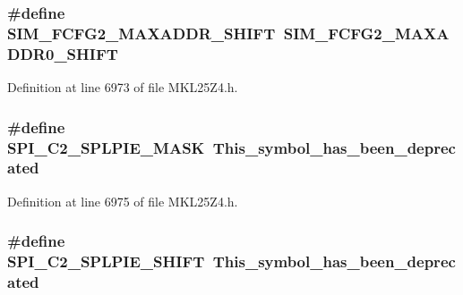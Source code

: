 \subsubsection[{\texorpdfstring{S\+I\+M\+\_\+\+F\+C\+F\+G2\+\_\+\+M\+A\+X\+A\+D\+D\+R\+\_\+\+S\+H\+I\+FT}{SIM_FCFG2_MAXADDR_SHIFT}}]{\setlength{\rightskip}{0pt plus 5cm}\#define S\+I\+M\+\_\+\+F\+C\+F\+G2\+\_\+\+M\+A\+X\+A\+D\+D\+R\+\_\+\+S\+H\+I\+FT~{\bf S\+I\+M\+\_\+\+F\+C\+F\+G2\+\_\+\+M\+A\+X\+A\+D\+D\+R0\+\_\+\+S\+H\+I\+FT}}\hypertarget{group___backward___compatibility___symbols_gae8fbe7e05f4c39ee13322ab15d75d089}{}\label{group___backward___compatibility___symbols_gae8fbe7e05f4c39ee13322ab15d75d089}


Definition at line 6973 of file M\+K\+L25\+Z4.\+h.

\subsubsection[{\texorpdfstring{S\+P\+I\+\_\+\+C2\+\_\+\+S\+P\+L\+P\+I\+E\+\_\+\+M\+A\+SK}{SPI_C2_SPLPIE_MASK}}]{\setlength{\rightskip}{0pt plus 5cm}\#define S\+P\+I\+\_\+\+C2\+\_\+\+S\+P\+L\+P\+I\+E\+\_\+\+M\+A\+SK~This\+\_\+symbol\+\_\+has\+\_\+been\+\_\+deprecated}\hypertarget{group___backward___compatibility___symbols_gadcaa58bac25c102454d3f54da041122f}{}\label{group___backward___compatibility___symbols_gadcaa58bac25c102454d3f54da041122f}


Definition at line 6975 of file M\+K\+L25\+Z4.\+h.

\subsubsection[{\texorpdfstring{S\+P\+I\+\_\+\+C2\+\_\+\+S\+P\+L\+P\+I\+E\+\_\+\+S\+H\+I\+FT}{SPI_C2_SPLPIE_SHIFT}}]{\setlength{\rightskip}{0pt plus 5cm}\#define S\+P\+I\+\_\+\+C2\+\_\+\+S\+P\+L\+P\+I\+E\+\_\+\+S\+H\+I\+FT~This\+\_\+symbol\+\_\+has\+\_\+been\+\_\+deprecated}\hypertarget{group___backward___compatibility___symbols_ga6b417fe91e6264b06ed45234e4bdb987}{}\label{group___backward___compatibility___symbols_ga6b417fe91e6264b06ed45234e4bdb987}


